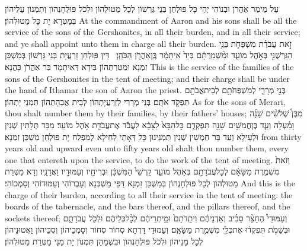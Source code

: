 {עַל מֵימַר אַהֲרֹן וּבְנוֹהִי יְהֵי כָּל פּוּלְחַן בְּנֵי גֵּרְשׁוֹן לְכָל מַטוּלְהוֹן וּלְכֹל פּוּלְחָנְהוֹן וְתִמְנוֹן עֲלֵיהוֹן בְּמַטְּרָא יָת כָּל מַטוּלְהוֹן׃}
{At the commandment of Aaron and his sons shall be all the service of the sons of the Gershonites, in all their burden, and in all their service; and ye shall appoint unto them in charge all their burden.}{}
{זֹ֣את עֲבֹדַ֗ת מִשְׁפְּחֹ֛ת בְּנֵ֥י הַגֵּרְשֻׁנִּ֖י בְּאֹ֣הֶל מוֹעֵ֑ד וּמִ֨שְׁמַרְתָּ֔ם בְּיַד֙ אִֽיתָמָ֔ר בֶּֽן\maqqaf אַהֲרֹ֖ן הַכֹּהֵֽן׃ \setuma }
{דֵּין פּוּלְחַן זַרְעֲיָת בְּנֵי גֵּרְשׁוֹן בְּמַשְׁכַּן זִמְנָא וּמַטַּרְתְּהוֹן בִּידָא דְּאִיתָמָר בַּר אַהֲרֹן כָּהֲנָא׃}
{This is the service of the families of the sons of the Gershonites in the tent of meeting; and their charge shall be under the hand of Ithamar the son of Aaron the priest.}{}
{בְּנֵ֖י מְרָרִ֑י לְמִשְׁפְּחֹתָ֥ם לְבֵית\maqqaf אֲבֹתָ֖ם תִּפְקֹ֥ד אֹתָֽם׃}
{בְּנֵי מְרָרִי לְזַרְעֲיָתְהוֹן לְבֵית אֲבָהָתְהוֹן תִּמְנֵי יָתְהוֹן׃}
{As for the sons of Merari, thou shalt number them by their families, by their fathers’ houses;}{}
{מִבֶּן֩ שְׁלֹשִׁ֨ים שָׁנָ֜ה וָמַ֗עְלָה וְעַ֛ד בֶּן\maqqaf חֲמִשִּׁ֥ים שָׁנָ֖ה תִּפְקְדֵ֑ם כׇּל\maqqaf הַבָּא֙ לַצָּבָ֔א לַעֲבֹ֕ד אֶת\maqqaf עֲבֹדַ֖ת אֹ֥הֶל מוֹעֵֽד׃}
{מִבַּר תְּלָתִין שְׁנִין וּלְעֵילָא וְעַד בַּר חַמְשִׁין שְׁנִין תִּמְנֵינוּן כָּל דְּאָתֵי לְחֵילָא לְמִפְלַח יָת פּוּלְחַן מַשְׁכַּן זִמְנָא׃}
{from thirty years old and upward even unto fifty years old shalt thou number them, every one that entereth upon the service, to do the work of the tent of meeting.}{}
{וְזֹאת֙ מִשְׁמֶ֣רֶת מַשָּׂאָ֔ם לְכׇל\maqqaf עֲבֹדָתָ֖ם בְּאֹ֣הֶל מוֹעֵ֑ד קַרְשֵׁי֙ הַמִּשְׁכָּ֔ן וּבְרִיחָ֖יו וְעַמּוּדָ֥יו וַאֲדָנָֽיו׃}
{וְדָא מַטְּרַת מַטוּלְהוֹן לְכָל פּוּלְחָנְהוֹן בְּמַשְׁכַּן זִמְנָא דַּפֵּי מַשְׁכְּנָא וְעָבְרוֹהִי וְעַמּוּדוֹהִי וְסָמְכוֹהִי׃}
{And this is the charge of their burden, according to all their service in the tent of meeting: the boards of the tabernacle, and the bars thereof, and the pillars thereof, and the sockets thereof;}{}
{וְעַמּוּדֵי֩ הֶחָצֵ֨ר סָבִ֜יב וְאַדְנֵיהֶ֗ם וִיתֵֽדֹתָם֙ וּמֵ֣יתְרֵיהֶ֔ם לְכׇ֨ל\maqqaf כְּלֵיהֶ֔ם וּלְכֹ֖ל עֲבֹדָתָ֑ם וּבְשֵׁמֹ֣ת תִּפְקְד֔וּ אֶת\maqqaf כְּלֵ֖י מִשְׁמֶ֥רֶת מַשָּׂאָֽם׃}
{וְעַמּוּדֵי דָּרְתָא סְחוֹר סְחוֹר וְסָמְכֵיהוֹן וְסִכֵּיהוֹן וַאֲטוּנֵיהוֹן לְכָל מָנֵיהוֹן וּלְכֹל פּוּלְחָנְהוֹן וּבִשְׁמָהָן תִּמְנוֹן יָת מָנֵי מַטְּרַת מַטוּלְהוֹן׃}
